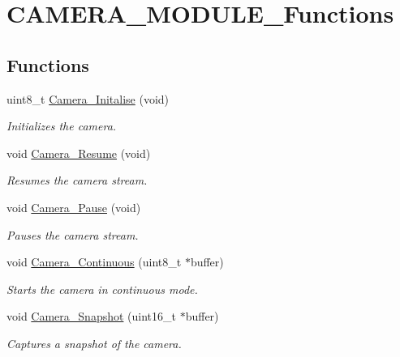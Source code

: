 \hypertarget{group___c_a_m_e_r_a___m_o_d_u_l_e___functions}{}\section{C\+A\+M\+E\+R\+A\+\_\+\+M\+O\+D\+U\+L\+E\+\_\+\+Functions}
\label{group___c_a_m_e_r_a___m_o_d_u_l_e___functions}
\subsection*{Functions}
\begin{DoxyCompactItemize}
\item 
uint8\+\_\+t \hyperlink{group___c_a_m_e_r_a___m_o_d_u_l_e___functions_ga25ba046b6cf761dd2b1813740277f30c}{Camera\+\_\+\+Initalise} (void)
\begin{DoxyCompactList}\small\item\em Initializes the camera. \end{DoxyCompactList}\item 
void \hyperlink{group___c_a_m_e_r_a___m_o_d_u_l_e___functions_gab3250105511ee890c3047100eea0c3e7}{Camera\+\_\+\+Resume} (void)
\begin{DoxyCompactList}\small\item\em Resumes the camera stream. \end{DoxyCompactList}\item 
void \hyperlink{group___c_a_m_e_r_a___m_o_d_u_l_e___functions_ga60e0802ecd6407c7f68ede1eec94276c}{Camera\+\_\+\+Pause} (void)
\begin{DoxyCompactList}\small\item\em Pauses the camera stream. \end{DoxyCompactList}\item 
void \hyperlink{group___c_a_m_e_r_a___m_o_d_u_l_e___functions_ga54aa8bb67e77b0ce7b12d4686c923480}{Camera\+\_\+\+Continuous} (uint8\+\_\+t $\ast$buffer)
\begin{DoxyCompactList}\small\item\em Starts the camera in continuous mode. \end{DoxyCompactList}\item 
void \hyperlink{group___c_a_m_e_r_a___m_o_d_u_l_e___functions_gaad66df57dbd5546f0a8dbe4a4d88fcf6}{Camera\+\_\+\+Snapshot} (uint16\+\_\+t $\ast$buffer)
\begin{DoxyCompactList}\small\item\em Captures a snapshot of the camera. \end{DoxyCompactList}\item 

\end{DoxyCompactItemize}
